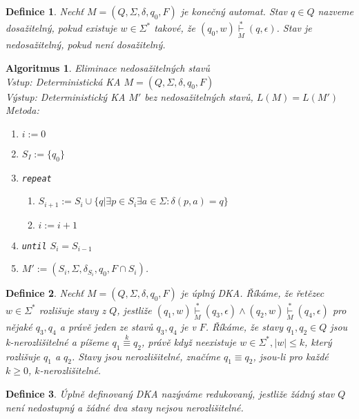 \documentclass[a4paper, 11pt]{report}
\newtheorem{mydef}{Definice}[chapter]
\newtheorem{alg}{Algoritmus}[chapter]
\begin{document}
\begin{mydef}
Nechť $M=(Q, \Sigma, \delta, q_0, F)$ je konečný automat. Stav $q \in Q$ nazveme \emph{dosažitelný}, pokud existuje $w \in \Sigma^*$ takové, že $(q_0, w) \underset{M}{\overset{*}{\vdash}} (q, \epsilon)$.
Stav je nedosažitelný, pokud není dosažitelný.
\end{mydef}

\begin{alg}
Eliminace nedosažitelných stavů \\
Vstup: Deterministická KA $M = (Q, \Sigma, \delta, q_0, F)$\\
Výstup: Deterministický KA $M'$ bez nedosažitelných stavů, $L(M) = L(M')$\\
Metoda:
\begin{enumerate}
	\item $i := 0$
	\item $S_I := \{q_0\}$
	\item \texttt{repeat}
	\begin{enumerate}
		\item $S_{i+1} := S_i \cup \{q | \exists p \in S_i \exists a \in \Sigma: \delta(p, a) = q \}$
		\item $i := i + 1$
	\end{enumerate}
	\item \texttt{until} $S_i = S_{i-1}$
	\item $M' := (S_i, \Sigma, \delta_{S_i}, q_0, F \cap S_i)$.
\end{enumerate}
\end{alg}

\begin{mydef}
Nechť $M = (Q, \Sigma, \delta, q_0, F)$ je úplný DKA. Říkáme, že řetězec $w \in \Sigma^*$ rozlišuje stavy z $Q$, jestliže
$(q_1, w) \underset{M}{\overset{*}{\vdash}} (q_3, \epsilon) \land (q_2, w) \underset{M}{\overset{*}{\vdash}} (q_4, \epsilon)$ pro nějaké $q_3, q_4$  a právě jeden ze stavů $q_3, q_4$ je v $F$. Říkáme, že stavy $q_1, q_2 \in Q$ jsou k-nerozlišitelné a píšeme $q_1 \overset{k}{\equiv} q_2$, právě když neexistuje $w \in \Sigma^*, |w| \leq k$, který rozlišuje $q_1$ a $q_2$. Stavy jsou nerozlišitelné, značíme $q_1 \equiv q_2$, jsou-li pro každé $k \geq 0$, $k$-nerozlišitelné.
\end{mydef}

\begin{mydef}
Úplně definovaný DKA nazýváme \emph{redukovaný}, jestliže žádný stav $Q$ není nedostupný a žádné dva stavy nejsou nerozlišitelné.
\end{mydef}
\end{document}
